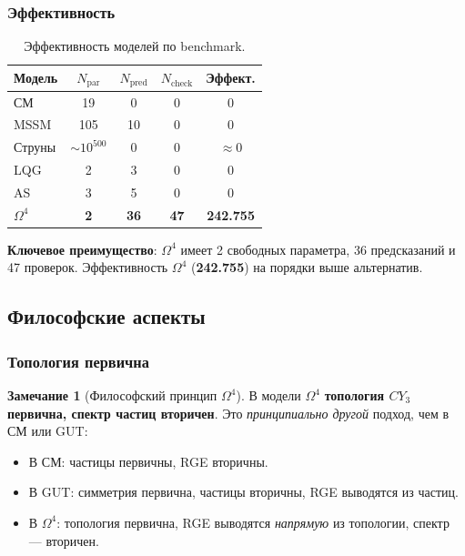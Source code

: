 \documentclass[11pt,a4paper]{article}
\newcommand{\CY}{\ensuremath{CY_3}}
\newcommand{\Om}{\ensuremath{\Omega^4}}
\theoremstyle{definition}
\newtheorem{remark}[theorem]{Замечание}
\begin{document}
\subsubsection{Эффективность}

\begin{table}[ht]
\centering
\small
\caption{Эффективность моделей по benchmark.}
\label{tab:benchmark-disc}
\begin{tabular}{lcccc}
\toprule
Модель & $N_{\text{par}}$ & $N_{\text{pred}}$ & $N_{\text{check}}$ & Эффект. \\
\midrule
СМ     & 19  & 0  & 0  & 0 \\
MSSM   & 105 & 10 & 0  & 0 \\
Струны & $\sim 10^{500}$ & 0 & 0 & $\approx 0$ \\
LQG    & 2   & 3  & 0  & 0 \\
AS     & 3   & 5  & 0  & 0 \\
\textbf{$\Om$} & \textbf{2} & \textbf{36} & \textbf{47} & \textbf{242.755} \\
\bottomrule
\end{tabular}
\end{table}

\medskip\noindent
\textbf{Ключевое преимущество}: $\Om$ имеет 2 свободных
параметра, 36 предсказаний и 47 проверок. Эффективность
$\Om$ (\textbf{242.755}) на порядки выше альтернатив.

\subsection{Философские аспекты}
\label{subsec:disc-philosophy}

\subsubsection{Топология первична}

\begin{remark}[Философский принцип $\Om$]
\label{rem:philosophy-topology}
В модели $\Om$ \textbf{топология $\CY$ первична, спектр частиц
вторичен}. Это \emph{принципиально другой} подход, чем в СМ
или GUT:
\begin{itemize}
    \item В СМ: частицы первичны, RGE вторичны.
    \item В GUT: симметрия первична, частицы вторичны,
          RGE выводятся из частиц.
    \item В $\Om$: топология первична, RGE выводятся \emph{напрямую}
          из топологии, спектр --- вторичен.
\end{itemize}
\end{remark}
\end{document}
